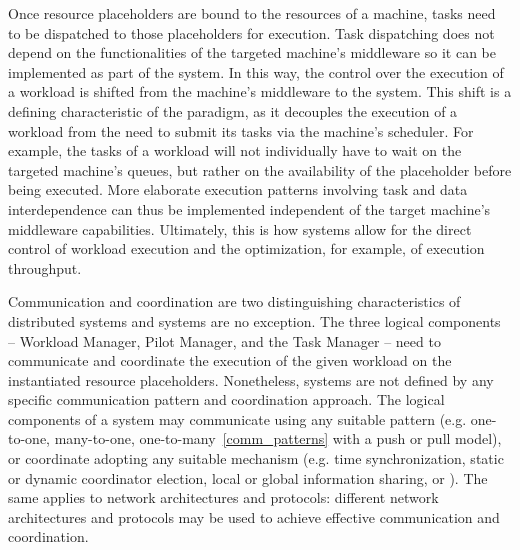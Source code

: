 \documentclass{sig-alternate}
\begin{document}
Once resource placeholders are bound to the resources of a machine, tasks need
to be dispatched to those placeholders for execution. Task dispatching does not
depend on the functionalities of the targeted machine's middleware so it can be
implemented as part of the \pilotjob system. In this way, the control over the
execution of a workload is shifted from the machine's middleware to the \pilot
system. This shift is a defining characteristic of the \pilot paradigm, as it
decouples the execution of a workload from the need to submit its tasks via the
machine's scheduler. For example, the tasks of a workload will not individually
have to wait on the targeted machine's queues, but rather on the availability of
the placeholder before being executed. More elaborate execution patterns
involving task and data interdependence can thus be implemented independent of
the target machine's middleware capabilities. Ultimately, this is how \pilotjob
systems allow for the direct control of workload execution and the optimization,
for example, of execution throughput. 
 

Communication and coordination are two distinguishing characteristics of
distributed systems and \pilotjob systems are no exception. The three logical
components -- Workload Manager, Pilot Manager, and the Task Manager -- need to
communicate and coordinate the execution of the given workload on the
instantiated resource placeholders.  Nonetheless, \pilotjob systems are not
defined by any specific communication pattern and coordination approach. The
logical components of a \pilotjob system may communicate using any suitable
pattern (e.g. one-to-one, many-to-one, one-to-many~\ref{comm_patterns} with a
push or pull model), or coordinate adopting any suitable mechanism (e.g. time
synchronization, static or dynamic coordinator election, local or global
information sharing, or \MW). The same applies to network architectures and
protocols: different network architectures and protocols may be used to achieve
effective communication and coordination.
\end{document}
